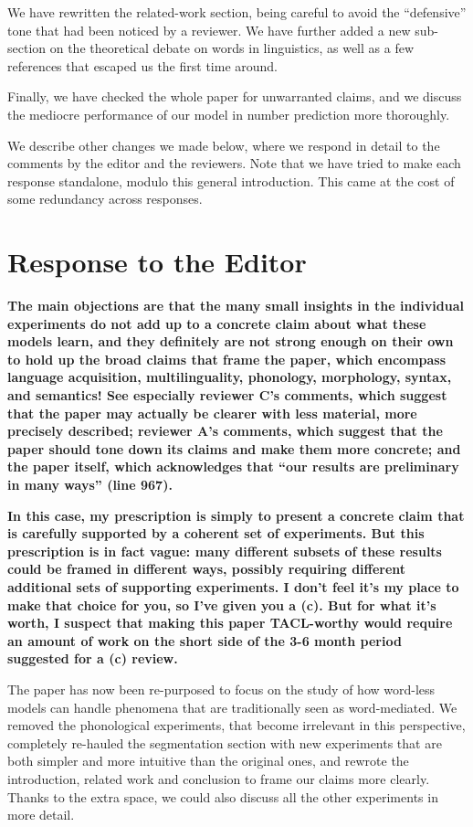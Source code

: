 \documentclass{article}[11pt,a4paper,oneside]
\begin{document}
We have rewritten the related-work section, being careful to avoid the ``defensive'' tone that had been noticed by a reviewer. We have further added a new sub-section on the theoretical debate on words in linguistics, as well as a few references that escaped us the first time around.

Finally, we have checked the whole paper for unwarranted claims, and we discuss the mediocre performance of our model in number prediction more thoroughly.

We describe other changes we made below, where we respond in detail to the comments by the editor and the reviewers. Note that we have tried to make each response standalone, modulo this general introduction. This came at the cost of some redundancy across responses.


\section{Response to the Editor}

\textbf{The main objections are that the many small insights in the individual experiments do not add up to a concrete claim about what these models learn, and they definitely are not strong enough on their own to hold up the broad claims that frame the paper, which encompass language acquisition, multilinguality, phonology, morphology, syntax, and semantics! See especially reviewer C's comments, which suggest that the paper may actually be clearer with less material, more precisely described; reviewer A's comments, which suggest that the paper should tone down its claims and make them more concrete; and the paper itself, which acknowledges that ``our results are preliminary in many ways'' (line 967).}

\textbf{In this case, my prescription is simply to present a concrete claim that is carefully supported by a coherent set of experiments. But this prescription is in fact vague: many different subsets of these results could be framed in different ways, possibly requiring different additional sets of supporting experiments. I don't feel it's my place to make that choice for you, so I've given you a (c). But for what it's worth, I suspect that making this paper TACL-worthy would require an amount of work on the short side of the 3-6 month period suggested for a (c) review.}

The paper has now been re-purposed to focus on the study of how word-less models can handle phenomena that are traditionally seen as word-mediated. We removed the phonological experiments, that become irrelevant in this perspective, completely re-hauled the segmentation section with new experiments that are both simpler and more intuitive than the original ones, and rewrote the introduction, related work and conclusion to frame our claims more clearly. Thanks to the extra space, we could also discuss all the other experiments in more detail.
\end{document}
